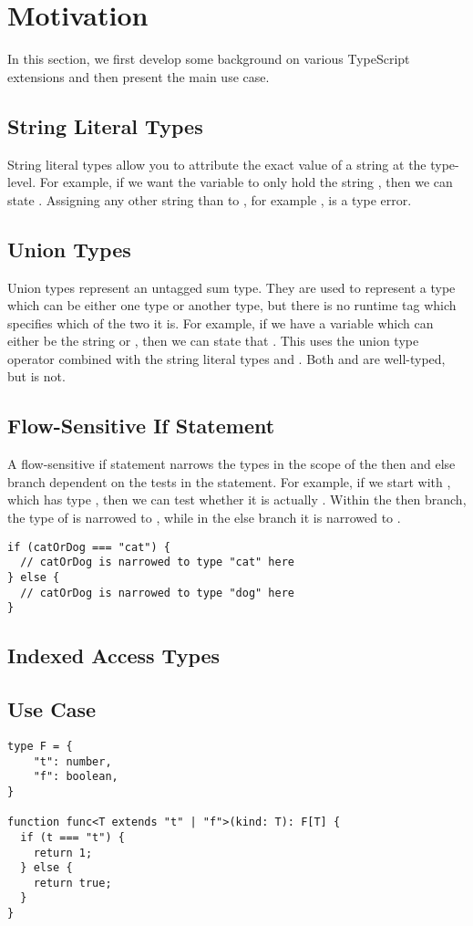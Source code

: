 \section{Motivation}
\label{sec:motivation}

In this section, we first develop some background on various TypeScript extensions and then present the main use case.

\subsection{String Literal Types}

String literal types allow you to attribute the exact value of a string at the type-level. For example, if we want the variable  to only hold the string , then we can state . Assigning any other string than  to , for example , is a type error.

\subsection{Union Types}

Union types represent an untagged sum type. They are used to represent a type which can be either one type or another type, but there is no runtime tag which specifies which of the two it is. For example, if we have a variable which can either be the string  or , then we can state that . This uses the union type operator \ts{|} combined with the string literal types  and . Both  and  are well-typed, but  is not.

\subsection{Flow-Sensitive If Statement}

A flow-sensitive if statement narrows the types in the scope of the then and else branch dependent on the tests in the statement. For example, if we start with , which has type , then we can test whether it is actually . Within the then branch, the type of  is narrowed to , while in the else branch it is narrowed to .

\begin{verbatim}
if (catOrDog === "cat") {
  // catOrDog is narrowed to type "cat" here
} else {
  // catOrDog is narrowed to type "dog" here
}
\end{verbatim}

\subsection{Indexed Access Types}

\subsection{Use Case}

\begin{verbatim}
type F = {
    "t": number,
    "f": boolean,
}

function func<T extends "t" | "f">(kind: T): F[T] {
  if (t === "t") {
    return 1;
  } else {
    return true;
  }
}
\end{verbatim}
